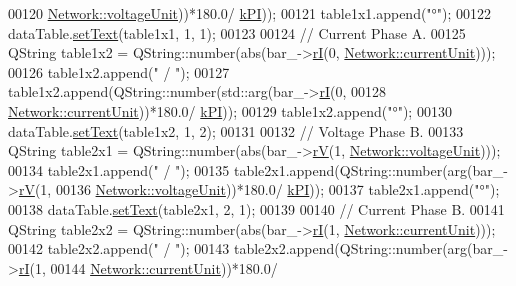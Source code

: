 \begin{DoxyCode}
00120                                       \hyperlink{group___graphics_gacde031ef95f5c05565ee35769f2ed89e}{Network::voltageUnit}))*180.0/
      \hyperlink{math__constants_8h_a368d99984512d9a6c6f18b37b4446431}{kPI}));
00121   table1x1.append(\textcolor{stringliteral}{"°"});
00122   dataTable.\hyperlink{class_data_table_aee0d28c77116b51360f0124a529cb3ff}{setText}(table1x1, 1, 1);
00123 
00124   \textcolor{comment}{// Current Phase A.}
00125   QString table1x2 = QString::number(abs(bar\_->\hyperlink{group___models_ga8a009531f01430aa68eba739bb0dc2ea}{rI}(0, \hyperlink{group___graphics_gac6a26db5fef2b1dd2a00faf6340d1702}{Network::currentUnit})));
00126   table1x2.append(\textcolor{stringliteral}{" / "});
00127   table1x2.append(QString::number(std::arg(bar\_->\hyperlink{group___models_ga8a009531f01430aa68eba739bb0dc2ea}{rI}(0,
00128                                   \hyperlink{group___graphics_gac6a26db5fef2b1dd2a00faf6340d1702}{Network::currentUnit}))*180.0/
      \hyperlink{math__constants_8h_a368d99984512d9a6c6f18b37b4446431}{kPI}));
00129   table1x2.append(\textcolor{stringliteral}{"°"});
00130   dataTable.\hyperlink{class_data_table_aee0d28c77116b51360f0124a529cb3ff}{setText}(table1x2, 1, 2);
00131 
00132   \textcolor{comment}{// Voltage Phase B.}
00133   QString table2x1 = QString::number(abs(bar\_->\hyperlink{group___models_ga2d1f6bfbd8abaf168bb75bd8e5cd9b5e}{rV}(1, \hyperlink{group___graphics_gacde031ef95f5c05565ee35769f2ed89e}{Network::voltageUnit})));
00134   table2x1.append(\textcolor{stringliteral}{" / "});
00135   table2x1.append(QString::number(arg(bar\_->\hyperlink{group___models_ga2d1f6bfbd8abaf168bb75bd8e5cd9b5e}{rV}(1,
00136                                       \hyperlink{group___graphics_gacde031ef95f5c05565ee35769f2ed89e}{Network::voltageUnit}))*180.0/
      \hyperlink{math__constants_8h_a368d99984512d9a6c6f18b37b4446431}{kPI}));
00137   table2x1.append(\textcolor{stringliteral}{"°"});
00138   dataTable.\hyperlink{class_data_table_aee0d28c77116b51360f0124a529cb3ff}{setText}(table2x1, 2, 1);
00139 
00140   \textcolor{comment}{// Current Phase B.}
00141   QString table2x2 = QString::number(abs(bar\_->\hyperlink{group___models_ga8a009531f01430aa68eba739bb0dc2ea}{rI}(1, \hyperlink{group___graphics_gac6a26db5fef2b1dd2a00faf6340d1702}{Network::currentUnit})));
00142   table2x2.append(\textcolor{stringliteral}{" / "});
00143   table2x2.append(QString::number(arg(bar\_->\hyperlink{group___models_ga8a009531f01430aa68eba739bb0dc2ea}{rI}(1,
00144                                       \hyperlink{group___graphics_gac6a26db5fef2b1dd2a00faf6340d1702}{Network::currentUnit}))*180.0/

\end{DoxyCode}
